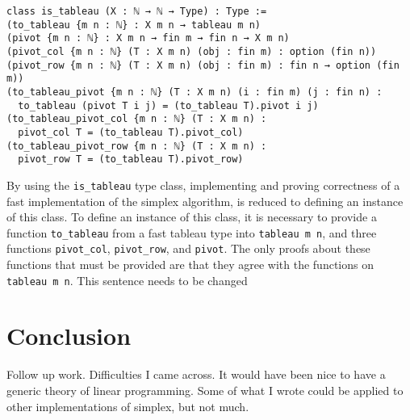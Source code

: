 \documentclass[11pt]{article} %
\begin{document}
\begin{lstlisting}
class is_tableau (X : ℕ → ℕ → Type) : Type :=
(to_tableau {m n : ℕ} : X m n → tableau m n)
(pivot {m n : ℕ} : X m n → fin m → fin n → X m n)
(pivot_col {m n : ℕ} (T : X m n) (obj : fin m) : option (fin n))
(pivot_row {m n : ℕ} (T : X m n) (obj : fin m) : fin n → option (fin m))
(to_tableau_pivot {m n : ℕ} (T : X m n) (i : fin m) (j : fin n) :
  to_tableau (pivot T i j) = (to_tableau T).pivot i j)
(to_tableau_pivot_col {m n : ℕ} (T : X m n) :
  pivot_col T = (to_tableau T).pivot_col)
(to_tableau_pivot_row {m n : ℕ} (T : X m n) :
  pivot_row T = (to_tableau T).pivot_row)
\end{lstlisting}

By using the \lstinline|is_tableau| type class, implementing and proving correctness of a fast implementation of the simplex algorithm, is reduced to defining an instance of this class. To define an instance of this class, it is necessary to provide a function \lstinline|to_tableau| from a fast tableau type into \lstinline|tableau m n|, and three functions \lstinline|pivot_col|, \lstinline|pivot_row|, and \lstinline|pivot|. The only proofs about these functions that must be provided are that they agree with the functions on \lstinline|tableau m n|. \color{red} This sentence needs to be changed \color{black}



\section{Conclusion}
\color{red}
Follow up work. Difficulties I came across. It would have been nice to have a generic theory of linear programming. Some of what I wrote could be applied to other implementations of simplex, but not much.
\color{black}

\end{document}
